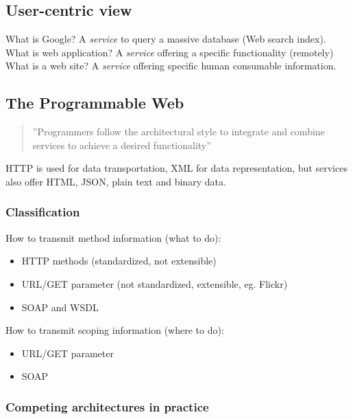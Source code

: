 \documentclass[a4paper]{report}
\begin{document}
\subsection{User-centric view}

What is Google? A \emph{service} to query a massive database (Web search
index). \\
What is web application? A \emph{service} offering a specific functionality
(remotely) \\
What is a web site? A \emph{service} offering specific human consumable
information.

\subsection{The Programmable Web}

\begin{quote}
    ''Programmers follow the architectural style to integrate and combine
    services to achieve a desired functionality''
\end{quote}

HTTP is used for data transportation, XML for data representation, but
services also offer HTML, JSON, plain text and binary data.

\subsubsection{Classification}

How to transmit method information (what to do):

\begin{itemize}
  \item HTTP methods (standardized, not extensible)
  \item URL/GET parameter (not standardized, extensible, eg. Flickr)
  \item SOAP and WSDL
\end{itemize}

How to transmit scoping information (where to do):

\begin{itemize}
  \item URL/GET parameter
  \item SOAP
\end{itemize}

\subsubsection{Competing architectures in practice}
\end{document}
